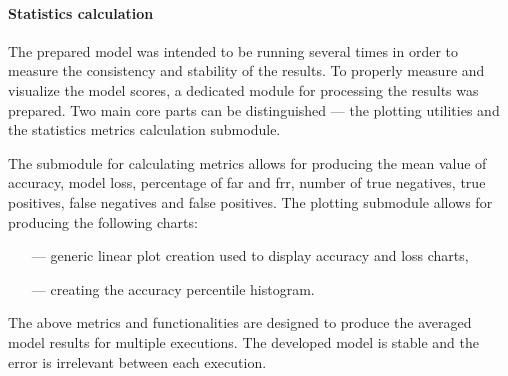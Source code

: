 \paragraph{Statistics calculation}\label{para:statistics-calculation}
The prepared model was intended to be running several times in order to measure the consistency and stability of the results.
To properly measure and visualize the model scores, a dedicated module for processing the results was prepared.
Two main core parts can be distinguished --- the plotting utilities and the statistics metrics calculation submodule.

The submodule for calculating metrics allows for producing the mean value of accuracy, model loss, percentage of \gls{far} and \gls{frr}, number of true negatives, true positives, false negatives and false positives.
The plotting submodule allows for producing the following charts:
\begin{samepage}
    \begin{itemize}
        \item[---] generic linear plot creation used to display accuracy and loss charts,
        \item[---] creating the accuracy percentile histogram.
    \end{itemize}
\end{samepage}

The above metrics and functionalities are designed to produce the averaged model results for multiple executions.
The developed model is stable and the error is irrelevant between each execution.
